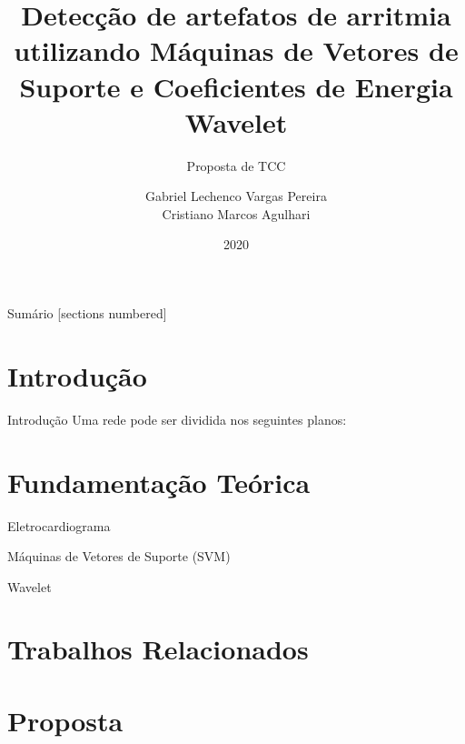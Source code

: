 \documentclass[10pt]{beamer}
\title{Detecção de artefatos de arritmia utilizando Máquinas de Vetores de Suporte e Coeficientes de Energia Wavelet}
\subtitle{Proposta de TCC}
\date{2020}
\author{Gabriel Lechenco Vargas Pereira \\
Cristiano Marcos Agulhari}
\institute{Universidade Tecnológica Federal do Paraná - UTFPR}
\begin{document}

\maketitle

\begin{frame}{Sumário}
  [sections numbered]
  \tableofcontents[hideallsubsections]
\end{frame}

\section{Introdução}

\begin{frame}{Introdução}
    Uma rede pode ser dividida nos seguintes planos:
\end{frame}

\section{Fundamentação Teórica}

\begin{frame}{Eletrocardiograma}
    
\end{frame}

\begin{frame}{Máquinas de Vetores de Suporte (SVM)}
    
\end{frame}

\begin{frame}{Wavelet}
    
\end{frame}

\section{Trabalhos Relacionados}

\section{Proposta}
\end{document}

